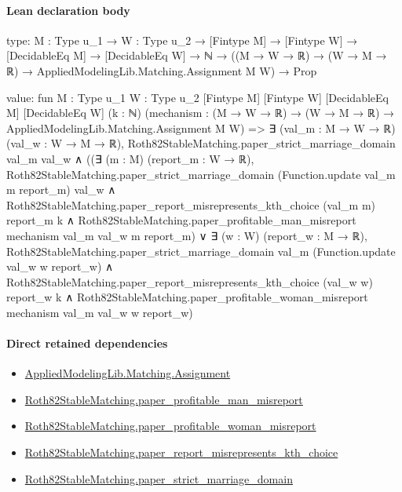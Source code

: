 \documentclass[10pt]{article}
\begin{document}
\paragraph{Lean declaration body}
\begin{ReviewVerbatim}
type:
{M : Type u_1} →
  {W : Type u_2} →
    [Fintype M] →
      [Fintype W] →
        [DecidableEq M] →
          [DecidableEq W] → ℕ → ((M → W → ℝ) → (W → M → ℝ) → AppliedModelingLib.Matching.Assignment M W) → Prop

value:
fun {M : Type u_1} {W : Type u_2} [Fintype M] [Fintype W] [DecidableEq M] [DecidableEq W] (k : ℕ)
    (mechanism : (M → W → ℝ) → (W → M → ℝ) → AppliedModelingLib.Matching.Assignment M W) =>
  ∃ (val_m : M → W → ℝ) (val_w : W → M → ℝ),
    Roth82StableMatching.paper_strict_marriage_domain val_m val_w ∧
      ((∃ (m : M) (report_m : W → ℝ),
          Roth82StableMatching.paper_strict_marriage_domain (Function.update val_m m report_m) val_w ∧
            Roth82StableMatching.paper_report_misrepresents_kth_choice (val_m m) report_m k ∧
              Roth82StableMatching.paper_profitable_man_misreport mechanism val_m val_w m report_m) ∨
        ∃ (w : W) (report_w : M → ℝ),
          Roth82StableMatching.paper_strict_marriage_domain val_m (Function.update val_w w report_w) ∧
            Roth82StableMatching.paper_report_misrepresents_kth_choice (val_w w) report_w k ∧
              Roth82StableMatching.paper_profitable_woman_misreport mechanism val_m val_w w report_w)
\end{ReviewVerbatim}

\paragraph{Direct retained dependencies}
\begin{itemize}\raggedright
\item \hyperlink{governing-declaration-508c084086b006b8}{Applied\allowbreak{}Modeling\allowbreak{}Lib.\allowbreak{}Matching.\allowbreak{}Assignment}
\item \hyperlink{governing-declaration-167d49d4619a658f}{Roth82\allowbreak{}Stable\allowbreak{}Matching.\allowbreak{}paper\_\allowbreak{}profitable\_\allowbreak{}man\_\allowbreak{}misreport}
\item \hyperlink{governing-declaration-9bd30c48345ff631}{Roth82\allowbreak{}Stable\allowbreak{}Matching.\allowbreak{}paper\_\allowbreak{}profitable\_\allowbreak{}woman\_\allowbreak{}misreport}
\item \hyperlink{governing-declaration-ce1e5725c9164a18}{Roth82\allowbreak{}Stable\allowbreak{}Matching.\allowbreak{}paper\_\allowbreak{}report\_\allowbreak{}misrepresents\_\allowbreak{}kth\_\allowbreak{}choice}
\item \hyperlink{governing-declaration-068b689808887691}{Roth82\allowbreak{}Stable\allowbreak{}Matching.\allowbreak{}paper\_\allowbreak{}strict\_\allowbreak{}marriage\_\allowbreak{}domain}
\end{itemize}
\hypertarget{governing-declaration-d7d2f9cb7d4bef58}{}
\end{document}
